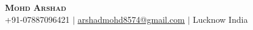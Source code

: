 \documentclass[letterpaper,9.8pt]{article}
\begin{document}
\begin{center}
    \textbf{\Huge \scshape Mohd Arshad} \\ \vspace{2pt}
    \small
    +91-07887096421     $|$ \href{mailto:arshadmohd8574@gmail.com}{\underline{arshadmohd8574@gmail.com}}     $|$ Lucknow India            \end{center}






\end{document}
